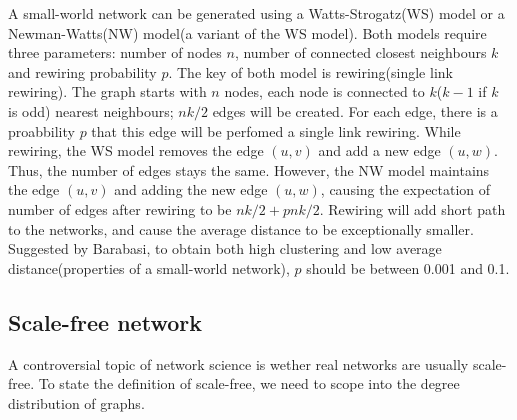 \documentclass[12pt]{article}
\begin{document}
A small-world network can be generated using a Watts-Strogatz(WS) model\cite{wsmodel} or a Newman-Watts(NW) model(a variant of the WS model)\cite{nwmodel}. Both models require three parameters: number of nodes $n$, number of connected closest neighbours $k$ and rewiring probability $p$. The key of both model is rewiring(single link rewiring). The graph starts with $n$ nodes, each node is connected to $k$($k-1$ if $k$ is odd) nearest neighbours; $nk/2$ edges will be created. For each edge, there is a proabbility $p$ that this edge will be perfomed a single link rewiring. While rewiring, the WS model removes the edge $(u,v)$ and add a new edge $(u,w)$. Thus, the number of edges stays the same. However, the NW model maintains the edge $(u,v)$ and adding the new edge $(u,w)$, causing the expectation of number of edges after rewiring to be $nk/2+pnk/2$. Rewiring will add short path to the networks, and cause the average distance to be exceptionally smaller. Suggested by Barabasi\cite{barabási2016network}, to obtain both high clustering and low average distance(properties of a small-world network), $p$ should be between 0.001 and 0.1.\\


\subsection{Scale-free network}
A controversial topic of network science is wether real networks are usually scale-free. To state the definition of scale-free, we need to scope into the degree distribution of graphs.\\
\end{document}
